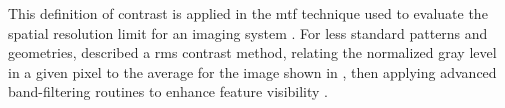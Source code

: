 \documentclass[../../../main.tex]{subfiles}%
\begin{document}
    This definition of contrast is applied in the \gls{mtf} technique used to evaluate the spatial resolution limit for an imaging system \cite{book:Shih_2010}.
    For less standard patterns and geometries, \citeauthor*{Peli_1990} described a \gls{rms} contrast method, relating the normalized gray level in a given pixel  to the average for the image  shown in , then applying advanced band-filtering routines to enhance feature visibility \cite{Peli_1990}.
\end{document}
